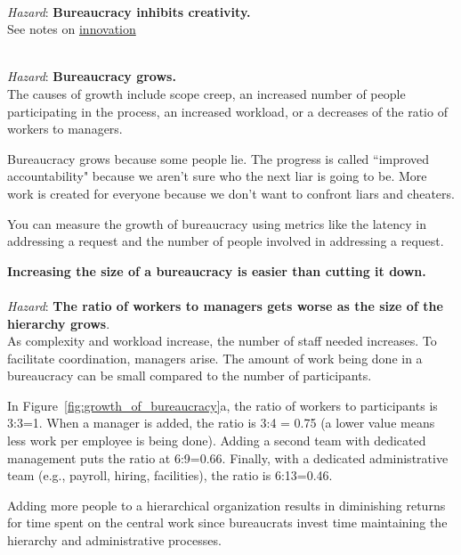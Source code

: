 \ \\
\begin{samepage}
\textit{Hazard}: \textbf{Bureaucracy inhibits creativity.}\\
See 
notes on 
\hyperref[sec:innovation]{innovation}\iftoggle{haspagenumbers}{ on page~\pageref{sec:innovation}.}{.}
\end{samepage}

\ \\
\textit{Hazard}: \textbf{Bureaucracy grows.}\\
The causes of growth include
scope creep, an increased number of people participating in the process, an increased workload, or a decreases of the ratio of workers to managers. 

Bureaucracy grows because some people lie. 
The progress is called ``improved accountability" because we aren't sure who the next liar is going to be.
More work is created for everyone because we don't want to confront  liars and cheaters. 


You can measure the growth of bureaucracy using metrics like the latency in addressing a request and the number of people involved in addressing a request.  

\textbf{Increasing the size of a bureaucracy is easier than cutting it down.}\\


\ \\
\textit{Hazard}: \textbf{The ratio of workers to managers gets worse as the size of the hierarchy grows}. \\
As complexity and workload increase, the number of staff needed increases. To facilitate coordination, managers arise. The amount of work being done in a bureaucracy can be small compared to the number of participants.

In Figure~\ref{fig:growth_of_bureaucracy}a, the ratio of workers to participants is 3:3=1. When a manager is added, the ratio is 3:4 = 0.75 (a lower value means less work per employee is being done). Adding a second team with dedicated management puts the ratio at 6:9=0.66. Finally, with a dedicated administrative team (e.g., payroll, hiring, facilities), the ratio is 6:13=0.46.

Adding more people to a hierarchical organization results in diminishing returns for time spent on the central work since bureaucrats invest time maintaining the hierarchy and administrative processes.


